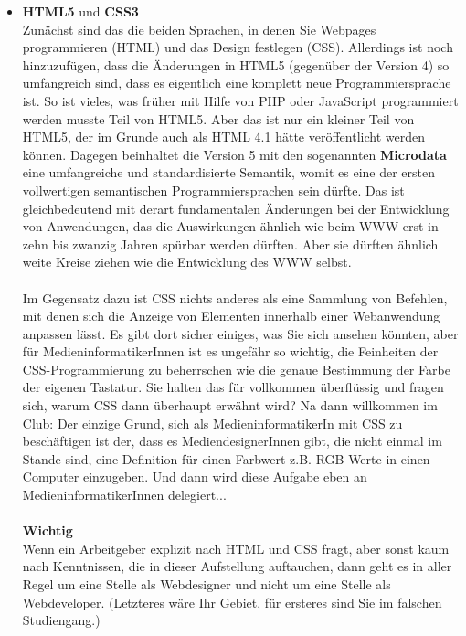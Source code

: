 \begin{itemize}
	\item \textbf{HTML5} und \textbf{CSS3}\\
	Zunächst sind das die beiden Sprachen, in denen Sie Webpages programmieren (HTML) und das Design festlegen (CSS). Allerdings ist noch hinzuzufügen, dass die Änderungen in HTML5 (gegenüber der Version 4) so umfangreich sind, dass es eigentlich eine komplett neue Programmiersprache ist. So ist vieles, was früher mit Hilfe von PHP oder JavaScript programmiert werden musste Teil von HTML5. Aber das ist nur ein kleiner Teil von HTML5, der im Grunde auch als HTML 4.1 hätte veröffentlicht werden können. Dagegen beinhaltet die Version 5 mit den sogenannten \textbf{Microdata} eine umfangreiche und standardisierte Semantik, womit es eine der ersten vollwertigen semantischen Programmiersprachen sein dürfte. Das ist gleichbedeutend mit derart fundamentalen Änderungen bei der Entwicklung von Anwendungen, das die Auswirkungen ähnlich wie beim WWW erst in zehn bis zwanzig Jahren spürbar werden dürften. Aber sie dürften ähnlich weite Kreise ziehen wie die Entwicklung des WWW selbst.\\
	\\
	Im Gegensatz dazu ist CSS nichts anderes als eine Sammlung von Befehlen, mit denen sich die Anzeige von Elementen innerhalb einer Webanwendung anpassen lässt. Es gibt dort sicher einiges, was Sie sich ansehen könnten, aber für MedieninformatikerInnen ist es ungefähr so wichtig, die Feinheiten der CSS-Programmierung zu beherrschen wie die genaue Bestimmung der Farbe der eigenen Tastatur. Sie halten das für vollkommen überflüssig und fragen sich, warum CSS dann überhaupt erwähnt wird? Na dann willkommen im Club: Der einzige Grund, sich als MedieninformatikerIn mit CSS zu beschäftigen ist der, dass es MediendesignerInnen gibt, die nicht einmal im Stande sind, eine Definition für einen Farbwert z.B. RGB-Werte in einen Computer einzugeben. Und dann wird diese Aufgabe eben an MedieninformatikerInnen delegiert...\\
	\\
	\textbf{Wichtig}\\
	Wenn ein Arbeitgeber explizit nach HTML und CSS fragt, aber sonst kaum nach Kenntnissen, die in dieser Aufstellung auftauchen, dann geht es in aller Regel um eine Stelle als Webdesigner und nicht um eine Stelle als Webdeveloper. (Letzteres wäre Ihr Gebiet, für ersteres sind Sie im falschen Studiengang.)


\end{itemize}
